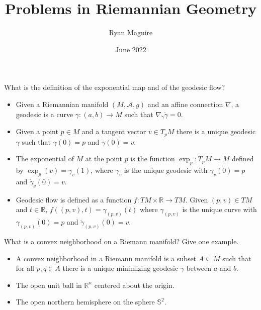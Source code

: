 \documentclass{beamer}
\title{Problems in Riemannian Geometry}
\author{Ryan Maguire}
\date{June 2022}
\begin{document}
    \maketitle
    \begin{frame}
        What is the definition of the exponential map and of the geodesic flow?
        \begin{itemize}
            \item Given a Riemannian manifold $(M,\mathcal{A},g)$ and an affine
                connection $\nabla$, a geodesic is a curve
                $\gamma:(a,b)\rightarrow{M}$ such that
                $\nabla_{\dot{\gamma}}\dot{\gamma}=0$.
            \item Given a point $p\in{M}$ and a tangent vector
                $v\in{T}_{p}M$ there is a unique geodesic $\gamma$ such that
                $\gamma(0)=p$ and $\dot{\gamma}(0)=v$.
            \item The exponential of $M$ at the point $p$ is the function
                $\exp_{p}:T_{p}M\rightarrow{M}$ defined by
                $\exp_{p}(v)=\gamma_{v}(1)$, where $\gamma_{v}$ is the unique
                geodesic with $\gamma_{v}(0)=p$ and $\dot{\gamma}_{v}(0)=v$.
            \item Geodesic flow is defined as a function
                $f:TM\times\mathbb{R}\rightarrow{TM}$. Given $(p,v)\in{TM}$
                and $t\in\mathbb{R}$, $f((p,v),t)=\gamma_{(p,v)}(t)$ where
                $\gamma_{(p,v)}$ is the unique curve with
                $\gamma_{(p,v)}(0)=p$ and $\dot{\gamma}_{(p,v)}(0)=v$.
        \end{itemize}
    \end{frame}
    \begin{frame}
        What is a convex neighborhood on a Riemann manifold? Give one example.
        \begin{itemize}
            \item A convex neighborhood in a Riemann manifold is a subset
                $A\subseteq{M}$ such that for all $p,q\in{A}$ there is a
                unique minimizing geodesic $\gamma$ between $a$ and $b$.
            \item The open unit ball in $\mathbb{R}^{n}$ centered about the
                origin.
            \item The open northern hemisphere on the sphere $\mathbb{S}^{2}$.
        \end{itemize}
    \end{frame}
\end{document}
